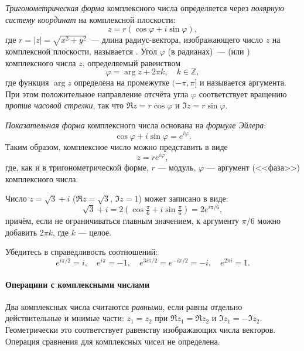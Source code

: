 \begin{labsupplement}
    \emph{Тригонометрическая форма} комплексного числа определяется через
    \emph{полярную систему координат} на комплексной плоскости:
    \[
        z = r\left(\cos\varphi + i\sin\varphi\right),
    \]
где $r = \left| z \right| = \sqrt{x^{2} + y^{2}}$~--- длина
    радиус-вектора, изображающего число $z$ на комплексной плоскости,
    называется . Угол $\varphi$ (в радианах)~---
     (или ) комплексного числа $z$, определяемый равенством
    \[
        \varphi = \arg z + 2 \pi k,\quad k \in \mathbb{Z},
    \]
    где функция $\arg z$ определена на промежутке $(-\pi,\pi]$
    и называется  аргумента.
    При этом положительное направление отсчёта угла $\varphi$
    соответствует вращению \emph{против часовой стрелки}, так что
    $\Re z = r\cos\varphi$ и $\Im z = r\sin\varphi$.

    \emph{Показательная форма} комплексного числа основана на \emph{формуле
    Эйлера}:
    \[
\cos \varphi + i \sin \varphi = e^{i\varphi}.
    \]
    Таким образом, комплексное число можно представить в виде
    \[
    z = re^{i\varphi},
    \]
    где, как и в тригонометрической форме, $r$ --- модуль, $\varphi$ ---
    аргумент (<<фаза>>) комплексного числа.

    \begin{lab:example}
    Число $z=\sqrt{3} + i$ ($\Re z = \sqrt{3}$, $\Im z = 1$) может записано в виде:
    \[
        \sqrt{3} + i = 2\left(\cos\tfrac{\pi}{6} + i\sin\tfrac{\pi}{6}\right) =
        2e^{i\pi/6},
    \]
    причём, если не ограничиваться главным значением,
    к аргументу $\pi/6$ можно добавить $2\pi k$, где $k$ --- целое.
    \end{lab:example}

    \begin{lab:exercise}
     Убедитесь в справедливость соотношений:
     \[
      e^{i\pi/2} = i,\quad e^{i\pi} = -1,\quad e^{3i\pi/2} = e^{-i\pi/2} =-i,\quad
      e^{2\pi i} = 1.
     \]
    \end{lab:exercise}

\paragraph{Операциии с комплексными числами}
    Два комплексных числа считаются
    \emph{равными}, если равны отдельно действительные и мнимые части:
    $z_1 = z_2$ при $\Re z_1=\Re z_2$ и $\Im z_1=-\Im z_2$. Геометрически
    это соответствует равенству изображающих числа векторов.
    Операция сравнения для комплексных чисел не определена.





\end{labsupplement}
